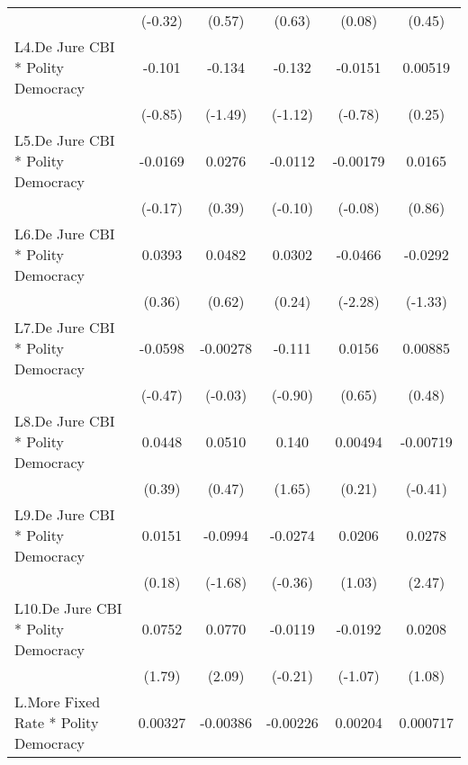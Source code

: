 {\begin{longtable}{l*{5}{c}}
                &  (-0.32)         &   (0.57)         &   (0.63)         &   (0.08)         &   (0.45)         \\
[1em]
L4.De Jure CBI * Polity Democracy&   -0.101         &   -0.134         &   -0.132         &  -0.0151         &  0.00519         \\
                &  (-0.85)         &  (-1.49)         &  (-1.12)         &  (-0.78)         &   (0.25)         \\
[1em]
L5.De Jure CBI * Polity Democracy&  -0.0169         &   0.0276         &  -0.0112         & -0.00179         &   0.0165         \\
                &  (-0.17)         &   (0.39)         &  (-0.10)         &  (-0.08)         &   (0.86)         \\
[1em]
L6.De Jure CBI * Polity Democracy&   0.0393         &   0.0482         &   0.0302         &  -0.0466\sym{*}  &  -0.0292         \\
                &   (0.36)         &   (0.62)         &   (0.24)         &  (-2.28)         &  (-1.33)         \\
[1em]
L7.De Jure CBI * Polity Democracy&  -0.0598         & -0.00278         &   -0.111         &   0.0156         &  0.00885         \\
                &  (-0.47)         &  (-0.03)         &  (-0.90)         &   (0.65)         &   (0.48)         \\
[1em]
L8.De Jure CBI * Polity Democracy&   0.0448         &   0.0510         &    0.140         &  0.00494         & -0.00719         \\
                &   (0.39)         &   (0.47)         &   (1.65)         &   (0.21)         &  (-0.41)         \\
[1em]
L9.De Jure CBI * Polity Democracy&   0.0151         &  -0.0994         &  -0.0274         &   0.0206         &   0.0278\sym{*}  \\
                &   (0.18)         &  (-1.68)         &  (-0.36)         &   (1.03)         &   (2.47)         \\
[1em]
L10.De Jure CBI * Polity Democracy&   0.0752         &   0.0770\sym{*}  &  -0.0119         &  -0.0192         &   0.0208         \\
                &   (1.79)         &   (2.09)         &  (-0.21)         &  (-1.07)         &   (1.08)         \\
[1em]
L.More Fixed Rate * Polity Democracy&  0.00327         & -0.00386         & -0.00226         &  0.00204         & 0.000717         \\

\end{longtable}}
